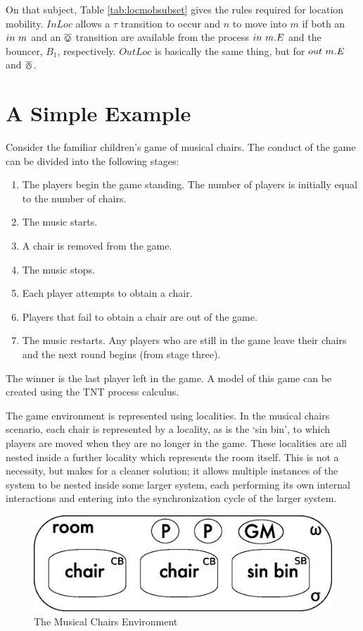 On that subject, Table \ref{tab:locmobsubset} gives the rules required
for location mobility.  $InLoc$ allows a $\tau$ transition to occur and
$n$ to move into $m$ if both an $in\ m$ and an $\overline{\varovee}$ transition
are available from the process $in\ m.E$ and the bouncer, $B_1$,
respectively.  $OutLoc$ is basically the same thing, but for
$out\ m.E$ and $\overline{\varowedge}$.


\section{A Simple Example}
\label{example}

Consider the familiar children's game of musical chairs.  The conduct of
the game can be divided into the following stages:

\begin{enumerate}
\item The players begin the game standing.  The number of players is
initially equal to the number of chairs.
\item The music starts.
\item A chair is removed from the game.
\item The music stops.
\item Each player attempts to obtain a chair.
\item Players that fail to obtain a chair are out of the game.
\item The music restarts.  Any players who are still in the game leave
  their chairs and the next round begins (from stage three).
\end{enumerate}

\noindent The winner is the last player left in the game.  A model of
this game can be created using the TNT process calculus.

The game environment is represented using localities.  In the musical
chairs scenario, each chair is represented by a locality, as is the `sin
bin', to which players are moved when they are no longer in the game.
These localities are all nested inside a further locality which
represents the room itself.  This is not a necessity, but makes for a
cleaner solution; it allows multiple instances of the system to be
nested inside some larger system, each performing its own internal
interactions and entering into the synchronization cycle of the larger
system.

\begin{figure}  
  \centering
  \includegraphics[scale=0.5]{gameenvbw}
  \caption{The Musical Chairs Environment}
  \label{fig:gameenv}
\end{figure}

